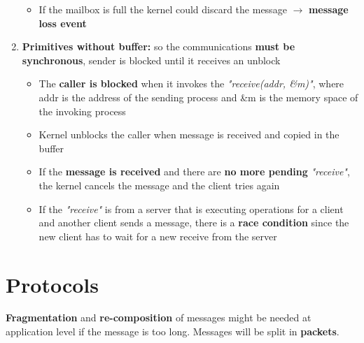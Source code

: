 \begin{enumerate}
\begin{itemize}
\begin{itemize}
                \end{itemize}
            \item If the mailbox is full the kernel could discard the message \(\rightarrow\) \textbf{message loss event}
        \end{itemize}
    \item \textbf{Primitives without buffer:} so the communications \textbf{must be synchronous}, sender is blocked until it receives an unblock
        \begin{itemize}
            \item The \textbf{caller is blocked} when it invokes the \textit{"receive(addr, \&m)"}, where addr is the address of the sending process and \&m is the memory space of the invoking process
            \item Kernel unblocks the caller when message is received and copied in the buffer
            \item If the \textbf{message is received} and there are \textbf{no more pending} \textit{"receive"}, the kernel cancels the message and the client tries again
            \item If the \textit{"receive"} is from a server that is executing operations for a client and another client sends a message, there is a \textbf{race condition} since the new client has to wait for a new receive from the server
        \end{itemize}
\end{enumerate} 

\section{Protocols}
\textbf{Fragmentation} and \textbf{re-composition} of messages might be needed at application level if the message is too long. Messages will be split in \textbf{packets}.

